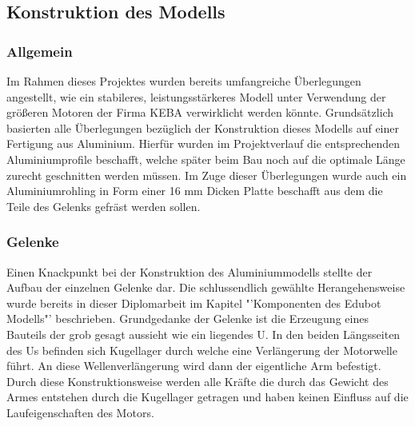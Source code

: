 \subsection{Konstruktion des Modells}
\subsubsection{Allgemein}
Im Rahmen dieses Projektes wurden bereits umfangreiche Überlegungen angestellt, wie ein stabileres, leistungsstärkeres Modell unter Verwendung der größeren Motoren der Firma KEBA verwirklicht werden könnte.
Grundsätzlich basierten alle Überlegungen bezüglich der Konstruktion dieses Modells auf einer Fertigung aus Aluminium. Hierfür wurden im Projektverlauf die entsprechenden Aluminiumprofile beschafft, welche später beim Bau noch auf die optimale Länge zurecht geschnitten werden müssen. 
Im Zuge dieser Überlegungen wurde auch ein Aluminiumrohling in Form einer 16 mm Dicken Platte beschafft aus dem die Teile des Gelenks gefräst werden sollen.

\subsubsection{Gelenke}
Einen Knackpunkt bei der Konstruktion des Aluminiummodells stellte der Aufbau der einzelnen Gelenke dar. Die schlussendlich gewählte Herangehensweise wurde bereits in dieser Diplomarbeit im Kapitel "'Komponenten des Edubot Modells"' beschrieben. Grundgedanke der Gelenke ist die Erzeugung eines Bauteils der grob gesagt aussieht wie ein liegendes U. In den beiden Längsseiten des Us befinden sich Kugellager durch welche eine Verlängerung der Motorwelle führt. 
An diese Wellenverlängerung wird dann der eigentliche Arm befestigt. Durch diese Konstruktionsweise werden alle Kräfte die durch das Gewicht des Armes entstehen durch die Kugellager getragen und haben keinen Einfluss auf die Laufeigenschaften des Motors.

